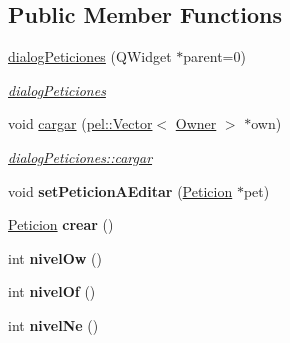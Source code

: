 \subsection*{Public Member Functions}
\begin{DoxyCompactItemize}
\item 
\hyperlink{classdialogPeticiones_a98d94817a71b0f17a67e4d50e26b0703}{dialog\+Peticiones} (Q\+Widget $\ast$parent=0)
\begin{DoxyCompactList}\small\item\em \hyperlink{classdialogPeticiones}{dialog\+Peticiones} \end{DoxyCompactList}\item 
\hypertarget{classdialogPeticiones_a463f39b52633828f8b8d7047f2770add}{}void \hyperlink{classdialogPeticiones_a463f39b52633828f8b8d7047f2770add}{cargar} (\hyperlink{classpel_1_1Vector}{pel\+::\+Vector}$<$ \hyperlink{classOwner}{Owner} $>$ $\ast$own)\label{classdialogPeticiones_a463f39b52633828f8b8d7047f2770add}

\begin{DoxyCompactList}\small\item\em \hyperlink{classdialogPeticiones_a463f39b52633828f8b8d7047f2770add}{dialog\+Peticiones\+::cargar} \end{DoxyCompactList}\item 
\hypertarget{classdialogPeticiones_a9338b72e5e007b990d8c95a7b12627ea}{}void {\bfseries set\+Peticion\+A\+Editar} (\hyperlink{classPeticion}{Peticion} $\ast$pet)\label{classdialogPeticiones_a9338b72e5e007b990d8c95a7b12627ea}

\item 
\hypertarget{classdialogPeticiones_a3675576259132999c6c52183c7c72bd2}{}\hyperlink{classPeticion}{Peticion} {\bfseries crear} ()\label{classdialogPeticiones_a3675576259132999c6c52183c7c72bd2}

\item 
\hypertarget{classdialogPeticiones_aef911f15aae9cb79ddc92a117dee4f8e}{}int {\bfseries nivel\+Ow} ()\label{classdialogPeticiones_aef911f15aae9cb79ddc92a117dee4f8e}

\item 
\hypertarget{classdialogPeticiones_a18140cebfc622999876f183eb42f6711}{}int {\bfseries nivel\+Of} ()\label{classdialogPeticiones_a18140cebfc622999876f183eb42f6711}

\item 
\hypertarget{classdialogPeticiones_a821022c92ea3a2f543dd0d4bd2916b50}{}int {\bfseries nivel\+Ne} ()\label{classdialogPeticiones_a821022c92ea3a2f543dd0d4bd2916b50}

\end{DoxyCompactItemize}


